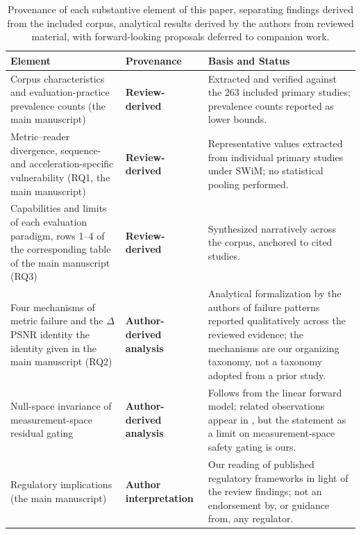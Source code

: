 \documentclass[11pt]{article}
\begin{document}
\begin{table}[t]
\centering
\caption{Provenance of each substantive element of this paper, separating findings derived from the included corpus, analytical results derived by the authors from reviewed material, with forward-looking proposals deferred to companion work.}
\label{tab:provenance}
\small
\setlength{\tabcolsep}{5pt}
\renewcommand{\arraystretch}{1.18}
\begin{tabular}{>{\raggedright\arraybackslash}p{} >{\raggedright\arraybackslash}p{} >{\raggedright\arraybackslash}p{}}
\hline
\textbf{Element} & \textbf{Provenance} & \textbf{Basis and Status} \\
\hline
Corpus characteristics and evaluation-practice prevalence counts (the main manuscript) & \textbf{Review-derived} & Extracted and verified against the 263 included primary studies; prevalence counts reported as lower bounds. \\
\hline
Metric--reader divergence, sequence- and acceleration-specific vulnerability (RQ1, the main manuscript) & \textbf{Review-derived} & Representative values extracted from individual primary studies under SWiM; no statistical pooling performed. \\
\hline
Capabilities and limits of each evaluation paradigm, rows 1--4 of the corresponding table of the main manuscript (RQ3) & \textbf{Review-derived} & Synthesized narratively across the corpus, anchored to cited studies. \\
\hline
Four mechanisms of metric failure and the $\Delta$PSNR identity the identity given in the main manuscript (RQ2) & \textbf{Author-derived analysis} & Analytical formalization by the authors of failure patterns reported qualitatively across the reviewed evidence; the mechanisms are our organizing taxonomy, not a taxonomy adopted from a prior study. \\
\hline
Null-space invariance of measurement-space residual gating & \textbf{Author-derived analysis} & Follows from the linear forward model; related observations appear in \cite{bhadra2021hallucinations,gottschling2020troublesome}, but the statement as a limit on measurement-space safety gating is ours. \\
\hline
Regulatory implications (the main manuscript) & \textbf{Author interpretation} & Our reading of published regulatory frameworks in light of the review findings; not an endorsement by, or guidance from, any regulator. \\
\hline
\end{tabular}
\end{table}
\end{document}
